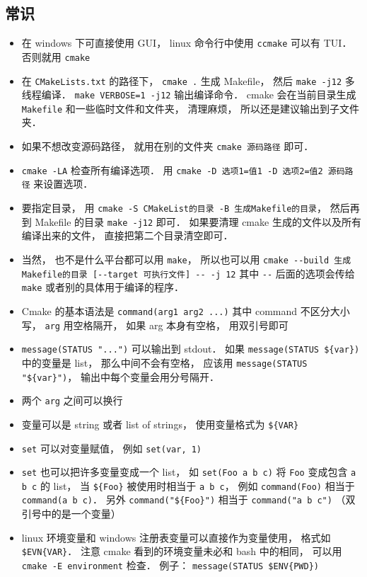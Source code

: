 
\begin{issues}
\issueDraft
\end{issues}


\subsection{常识}
\begin{itemize}
\item 在 windows 下可直接使用 GUI， linux 命令行中使用 \verb`ccmake` 可以有 TUI． 否则就用 \verb`cmake`
\item 在 \verb|CMakeLists.txt| 的路径下， \verb`cmake .` 生成 Makefile， 然后 \verb|make -j12| 多线程编译． \verb|make VERBOSE=1 -j12| 输出编译命令． cmake 会在当前目录生成 \verb|Makefile| 和一些临时文件和文件夹， 清理麻烦， 所以还是建议输出到子文件夹．
\item 如果不想改变源码路径， 就用在别的文件夹 \verb|cmake 源码路径| 即可．
\item \verb|cmake -LA| 检查所有编译选项． 用 \verb|cmake -D 选项1=值1 -D 选项2=值2 源码路径| 来设置选项．
\item 要指定目录， 用 \verb|cmake -S CMakeList的目录 -B 生成Makefile的目录|， 然后再到 Makefile 的目录 \verb|make -j12| 即可． 如果要清理 cmake 生成的文件以及所有编译出来的文件， 直接把第二个目录清空即可．
\item 当然， 也不是什么平台都可以用 \verb|make|， 所以也可以用 \verb|cmake --build 生成Makefile的目录 [--target 可执行文件] -- -j 12| 其中 \verb|--| 后面的选项会传给 \verb|make| 或者别的具体用于编译的程序．
\item Cmake 的基本语法是 \verb`command(arg1 arg2 ...)` 其中 command 不区分大小写， \verb`arg` 用空格隔开， 如果 arg 本身有空格， 用双引号即可
\item \verb`message(STATUS "...")` 可以输出到 stdout． 如果 \verb`message(STATUS ${var})` 中的变量是 list， 那么中间不会有空格， 应该用 \verb`message(STATUS "${var}")`， 输出中每个变量会用分号隔开．
\item 两个 \verb`arg` 之间可以换行
\item 变量可以是 string 或者 list of strings， 使用变量格式为 \verb`${VAR}`
\item \verb`set` 可以对变量赋值， 例如 \verb`set(var, 1)`
\item \verb`set` 也可以把许多变量变成一个 list， 如 \verb`set(Foo a b c)` 将 \verb`Foo` 变成包含 \verb`a b c` 的 list， 当 \verb`${Foo}` 被使用时相当于 \verb`a b c`， 例如 \verb`command(Foo)` 相当于 \verb`command(a b c)`． 另外 \verb`command("${Foo}")` 相当于 \verb`command("a b c")` （双引号中的是一个变量）
\item linux 环境变量和 windows 注册表变量可以直接作为变量使用， 格式如 \verb`$EVN{VAR}`． 注意 cmake 看到的环境变量未必和 bash 中的相同， 可以用 \verb`cmake -E environment` 检查． 例子： \verb|message(STATUS $ENV{PWD})|
\end{itemize}

